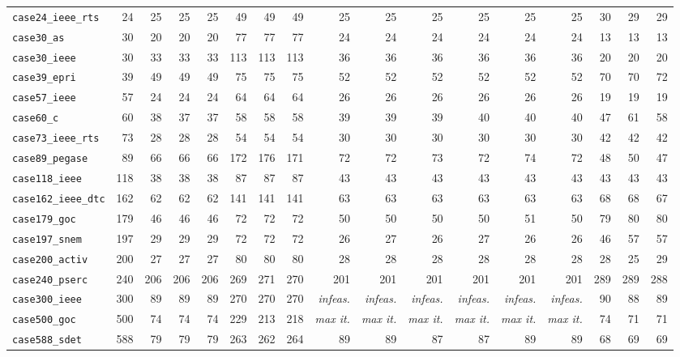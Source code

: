 {\begin{longtable}{lrrrrrrrrrrrrrrrr}
\texttt{case24\_ieee\_rts} & 24 & 25 & 25 & 25 & 49 & 49 & 49 & 25 & 25 & 25 & 25 & 25 & 25 & 30 & 29 & 29 \\
\texttt{case30\_as} & 30 & 20 & 20 & 20 & 77 & 77 & 77 & 24 & 24 & 24 & 24 & 24 & 24 & 13 & 13 & 13 \\
\texttt{case30\_ieee} & 30 & 33 & 33 & 33 & 113 & 113 & 113 & 36 & 36 & 36 & 36 & 36 & 36 & 20 & 20 & 20 \\
\texttt{case39\_epri} & 39 & 49 & 49 & 49 & 75 & 75 & 75 & 52 & 52 & 52 & 52 & 52 & 52 & 70 & 70 & 72 \\
\texttt{case57\_ieee} & 57 & 24 & 24 & 24 & 64 & 64 & 64 & 26 & 26 & 26 & 26 & 26 & 26 & 19 & 19 & 19 \\
\texttt{case60\_c} & 60 & 38 & 37 & 37 & 58 & 58 & 58 & 39 & 39 & 39 & 40 & 40 & 40 & 47 & 61 & 58 \\
\texttt{case73\_ieee\_rts} & 73 & 28 & 28 & 28 & 54 & 54 & 54 & 30 & 30 & 30 & 30 & 30 & 30 & 42 & 42 & 42 \\
\texttt{case89\_pegase} & 89 & 66 & 66 & 66 & 172 & 176 & 171 & 72 & 72 & 73 & 72 & 74 & 72 & 48 & 50 & 47 \\
\texttt{case118\_ieee} & 118 & 38 & 38 & 38 & 87 & 87 & 87 & 43 & 43 & 43 & 43 & 43 & 43 & 43 & 43 & 43 \\
\texttt{case162\_ieee\_dtc} & 162 & 62 & 62 & 62 & 141 & 141 & 141 & 63 & 63 & 63 & 63 & 63 & 63 & 68 & 68 & 67 \\
\texttt{case179\_goc} & 179 & 46 & 46 & 46 & 72 & 72 & 72 & 50 & 50 & 50 & 50 & 51 & 50 & 79 & 80 & 80 \\
\texttt{case197\_snem} & 197 & 29 & 29 & 29 & 72 & 72 & 72 & 26 & 27 & 26 & 27 & 26 & 26 & 46 & 57 & 57 \\
\texttt{case200\_activ} & 200 & 27 & 27 & 27 & 80 & 80 & 80 & 28 & 28 & 28 & 28 & 28 & 28 & 28 & 25 & 29 \\
\texttt{case240\_pserc} & 240 & 206 & 206 & 206 & 269 & 271 & 270 & 201 & 201 & 201 & 201 & 201 & 201 & 289 & 289 & 288 \\
\texttt{case300\_ieee} & 300 & 89 & 89 & 89 & 270 & 270 & 270 & \textit{infeas.} & \textit{infeas.} & \textit{infeas.} & \textit{infeas.} & \textit{infeas.} & \textit{infeas.} & 90 & 88 & 89 \\
\texttt{case500\_goc} & 500 & 74 & 74 & 74 & 229 & 213 & 218 & \textit{max it.} & \textit{max it.} & \textit{max it.} & \textit{max it.} & \textit{max it.} & \textit{max it.} & 74 & 71 & 71 \\
\texttt{case588\_sdet} & 588 & 79 & 79 & 79 & 263 & 262 & 264 & 89 & 89 & 87 & 87 & 89 & 89 & 68 & 69 & 69 \\

\end{longtable}}
